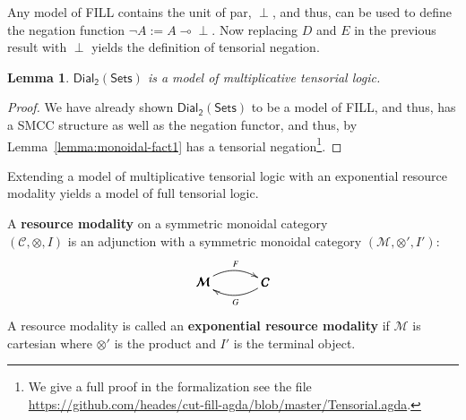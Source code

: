 \documentclass{elsarticle}
\newcommand{\cat}[1]{\mathcal{#1}}
\newcommand{\limp}[0]{\multimap}
\newcommand{\dial}[0]{\mathsf{Dial_2}(\mathsf{Sets})}
\newtheorem{lemma}[theorem]{Lemma}
\begin{document}
Any model of FILL contains the unit of par, $\perp$, and thus, can be
used to define the negation function $\lnot A := A \limp \perp$.  Now
replacing $D$ and $E$ in the previous result with $\perp$ yields the
definition of tensorial negation.
\begin{lemma}
  \label{lemma:dial-tensorial}
  $\dial$ is a model of multiplicative tensorial logic.
\end{lemma}
\begin{proof}
  We have already shown $\dial$ to be a model of FILL, and thus, has a
  SMCC structure as well as the negation functor, and thus, by
  Lemma~\ref{lemma:monoidal-fact1} has a tensorial
  negation\footnote{We give a full proof in the formalization see the
    file
    \url{https://github.com/heades/cut-fill-agda/blob/master/Tensorial.agda}.}.
\end{proof}

Extending a model of multiplicative tensorial logic with an exponential
resource modality yields a model of full tensorial logic.
\begin{definition}
  \label{def:resource-modality}
  A \textbf{resource modality} on a symmetric monoidal category\\
  $(\cat{C}, \otimes, I)$ is an adjunction with a symmetric monoidal
  category $(\cat{M}, \otimes', I')$:
  \[
  \bfig
  \morphism(0,0)|a|/{@{>}@/^1em/}/<500,0>[\cat{M}`\cat{C};F]
  \morphism(0,0)|b|/{@{<-}@/_1em/}/<500,0>[\cat{M}`\cat{C};G]
  \efig
  \]
  A resource modality is called an \textbf{exponential resource
    modality} if $\cat{M}$ is cartesian where $\otimes'$ is the
  product and $I'$ is the terminal object.
\end{definition}
\end{document}
